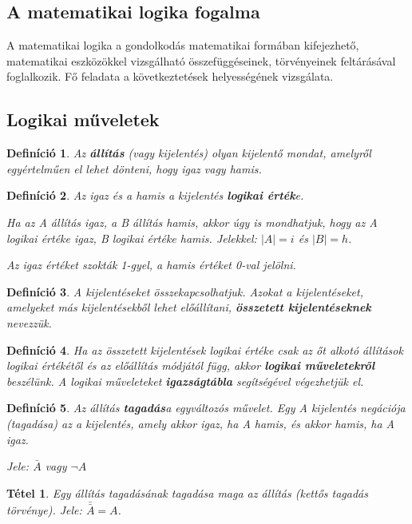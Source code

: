 \documentclass[12pt,a4paper]{article}
\newtheorem{theorem}{Tétel} [section]
\newtheorem{definition}{Definíció} [section]
\begin{document}
\subsection{A matematikai logika fogalma}
A matematikai logika a gondolkodás matematikai formában kifejezhető, matematikai eszközökkel vizsgálható összefüggéseinek, törvényeinek feltárásával foglalkozik. Fő feladata a következtetések helyességének vizsgálata.

\subsection{Logikai műveletek}

\begin{definition}
Az \textbf{állítás} (vagy kijelentés) olyan kijelentő mondat, amelyről egyértelműen el lehet dönteni, hogy igaz vagy hamis.
\end{definition}

\begin{definition}
Az igaz és a hamis a kijelentés \textbf{logikai érték}e.

Ha az A állítás igaz, a B állítás hamis, akkor úgy is mondhatjuk, hogy az A logikai értéke igaz, B logikai értéke hamis. Jelekkel: $|A|= i$ és $|B|= h$.

Az igaz értéket szokták 1-gyel, a hamis értéket 0-val jelölni.
\end{definition}

\begin{definition}
 A kijelentéseket összekapcsolhatjuk. Azokat a kijelentéseket, amelyeket más kijelentésekből lehet előállítani, \textbf{összetett kijelentéseknek} nevezzük.
\end{definition}

\begin{definition}
Ha az összetett kijelentések logikai értéke csak az őt alkotó állítások logikai értékétől és az előállítás módjától függ, akkor \textbf{logikai műveletekről} beszélünk. A logikai műveleteket \textbf{igazságtábla} segítségével végezhetjük el.
\end{definition}

\begin{definition}
Az állítás \textbf{tagadás}a egyváltozós művelet. Egy A kijelentés negációja (tagadása) az a kijelentés, amely akkor igaz, ha A hamis, és akkor hamis, ha A igaz.

Jele: $\bar{A}$ vagy $\neg A$
\end{definition}

\begin{theorem}
Egy állítás tagadásának tagadása maga az állítás (kettős tagadás törvénye). Jele: $\bar{\bar{A}} = A$.
\end{theorem}
\end{document}
